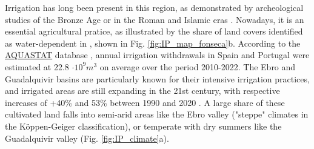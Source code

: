 Irrigation has long been present in this region, as demonstrated by archeological studies of the Bronze Age \citep[2140-1500 BCE, ][]{mora-gonzalez_isotopic_2016} or in the Roman and Islamic eras \citep[250-800, ][]{butzer_irrigation_1985}. 
Nowadays, it is an essential agricultural pratice, as illustrated by the share of land covers identified as water-dependent in \citet{fonseca_agricultural_2022}, shown in Fig. \ref{fig:IP_map_fonseca}b. 
According to the \href{https://data.apps.fao.org/aquastat/?lang=en}{AQUASTAT} database \citep[presented in][]{frenken_aquastat_2012}, annual irrigation withdrawals in Spain and Portugal were estimated at 22.8 $\cdot 10^{9} m^3$ on average over the period 2010-2022.
The Ebro and Guadalquivir basins are particularly known for their intensive irrigation practices, and irrigated areas are still expanding in the 21st century, with respective increases of +40\% and 53\% between 1990 and 2020 \citep{fonseca_agricultural_2022}. A large share of these cultivated land falls into semi-arid areas like the Ebro valley ("steppe" climates in the Köppen-Geiger classification), or temperate with dry summers like the Guadalquivir valley (Fig. \ref{fig:IP_climate}a).

